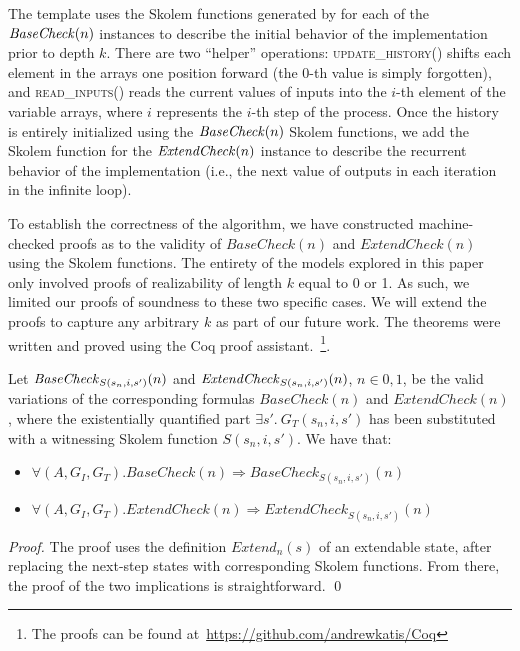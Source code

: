The template uses the Skolem functions generated by \aeval for each
of the ${\mathit {BaseCheck}}(n)$ instances to describe the initial behavior of
the implementation prior to depth $k$.  %
There are two ``helper'' operations:
\textsc{update\_history()} shifts each element in the arrays one position
forward (the 0-th value is simply forgotten), and \textsc{read\_inputs()} reads the
current values of inputs into the $i$-th element of the variable arrays,
where $i$ represents the $i$-th step of the process.
Once the history is entirely initialized using the ${\mathit {BaseCheck}}(n)$ Skolem functions,
we add the Skolem function for the ${\mathit {ExtendCheck}}(n)$ instance to describe the
recurrent behavior of the implementation (i.e., the next value of outputs in
each iteration in the infinite loop).

To establish the correctness of the algorithm,
we have constructed machine-checked proofs as to the validity of $\mathit{BaseCheck(n)}$ and
$\mathit{ExtendCheck(n)}$ using the Skolem functions.
The entirety of the models explored in
this paper only involved proofs of realizability of length $k$ equal to 0 or
1.
As such, we limited our proofs of soundness to these two specific cases. We will
extend the proofs to capture any arbitrary $k$ as part of our future work.
The theorems were written and proved using the Coq proof
assistant.~\footnote{The proofs can be found
at~\href{https://github.com/andrewkatis/Coq}{https://github.com/andrewkatis/Coq}}.

\begin{theorem}
Let ${\mathit {BaseCheck}}_{S(s_n,i,s')}(n)$ and ${\mathit {ExtendCheck}}_{S(s_n,i,s')}(n)$, $n \in {0,1}$, be the valid variations of the corresponding formulas $\mathit{BaseCheck(n)}$ and $\mathit{ExtendCheck(n)}$, where the existentially quantified part $\exists s'.~G_T(s_n, i, s')$ has been substituted with a witnessing Skolem function
$S(s_n,i,s')$.  We have that:
\begin{itemize}
\item $\forall (A,G_{I},G_{T}). \mathit{BaseCheck}(n) \Rightarrow \mathit{BaseCheck}_{S(s_n,i,s')}(n)$
\item $\forall (A,G_{I},G_{T}). \mathit{ExtendCheck}(n) \Rightarrow
ExtendCheck_{S(s_n,i,s')}(n)$
\end{itemize}
\end{theorem}
\begin{proof}
The proof uses the definition $\mathit{Extend}_n(s)$ of an extendable state,
after replacing the next-step states with corresponding Skolem functions. From there,
the proof of the two implications is straightforward.
\qed
\end{proof}

